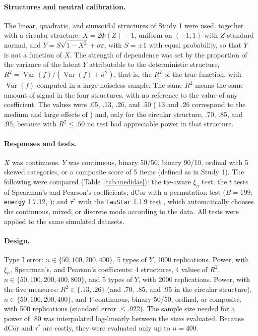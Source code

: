 \documentclass[man,mask,donotrepeattitle,floatsintext]{apa7}
\begin{document}
\paragraph{Structures and neutral calibration.} The linear, quadratic, and sinusoidal structures of Study 1 were used, together with a circular structure: $X=2\Phi(Z)-1$, uniform on $(-1,1)$ with $Z$ standard normal, and $Y=S\sqrt{1-X^2}+\sigma\varepsilon$, with $S=\pm1$ with equal probability, so that $Y$ is not a function of $X$. The strength of dependence was set by the proportion of the variance of the latent $Y$ attributable to the deterministic structure, $R^2=\operatorname{Var}(f)/(\operatorname{Var}(f)+\sigma^2)$, that is, the $R^2$ of the true function, with $\operatorname{Var}(f)$ computed in a large noiseless sample. The same $R^2$ means the same amount of signal in the four structures, with no reference to the value of any coefficient. The values were .05, .13, .26, and .50 (.13 and .26 correspond to the medium and large effects of \textcite{cohen1988}) and, only for the circular structure, .70, .85, and .95, because with $R^2\le .50$ no test had appreciable power in that structure.

\paragraph{Responses and tests.} $X$ was continuous. $Y$ was continuous, binary 50/50, binary 90/10, ordinal with 5 skewed categories, or a composite score of 5 items (defined as in Study 1). The following were compared (Table~\ref{tab:medidas}): the tie-aware $\xi_n$ test; the $t$ tests of Spearman's and Pearson's coefficients; dCor with a permutation test ($B=199$; \texttt{energy} 1.7.12, \cite{rizzo2024energy}); and $\tau^*$ with the \texttt{TauStar} 1.1.9 test \parencite{weihs2026taustar}, which automatically chooses the continuous, mixed, or discrete mode according to the data. All tests were applied to the same simulated datasets.

\paragraph{Design.} Type I error: $n\in\{50,100,200,400\}$, 5 types of $Y$, 1000 replications. Power, with $\xi_n$, Spearman's, and Pearson's coefficients: 4 structures, 4 values of $R^2$, $n\in\{50,100,200,400,800\}$, and 5 types of $Y$, with 2000 replications. Power, with the five measures: $R^2\in\{.13,.26\}$ (and .70, .85, and .95 in the circular structure), $n\in\{50,100,200,400\}$, and $Y$ continuous, binary 50/50, ordinal, or composite, with 500 replications (standard error $\le .022$). The sample size needed for a power of .80 was interpolated log-linearly between the sizes evaluated. Because dCor and $\tau^*$ are costly, they were evaluated only up to $n=400$.
\end{document}
